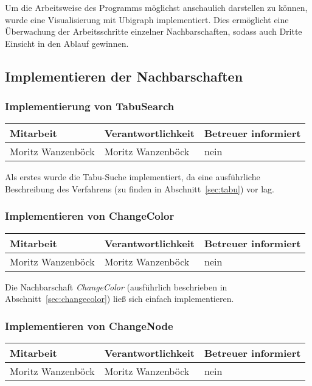 Um die Arbeitsweise des Programms möglichst anschaulich darstellen zu können, wurde eine Visualisierung mit Ubigraph implementiert. Dies ermöglicht eine Überwachung der Ar\-beits\-schrit\-te einzelner Nachbarschaften, sodass auch Dritte Einsicht in den Ablauf gewinnen.

\subsection{Implementieren der Nachbarschaften}

\subsubsection{ Implementierung von TabuSearch}

\begin{center}
\begin{tabular}{lll}
	Mitarbeit & Verantwortlichkeit & Betreuer informiert \\
	\hline
	Moritz Wanzenböck & Moritz Wanzenböck & nein \\
\end{tabular}
\end{center}

Als erstes wurde die Tabu-Suche implementiert, da eine ausführliche Beschreibung des Verfahrens (zu finden in Abschnitt~\ref{sec:tabu}) vor lag.

\subsubsection{ Implementieren von ChangeColor}
\begin{center}
\begin{tabular}{lll}
	Mitarbeit & Verantwortlichkeit & Betreuer informiert \\
	\hline
	Moritz Wanzenböck & Moritz Wanzenböck & nein \\
\end{tabular}
\end{center}

Die Nachbarschaft \emph{ChangeColor} (ausführlich beschrieben in Abschnitt~\ref{sec:changecolor}) ließ sich einfach implementieren.

\subsubsection{ Implementieren von ChangeNode} 

\begin{center}
\begin{tabular}{lll}
	Mitarbeit & Verantwortlichkeit & Betreuer informiert \\
	\hline
	Moritz Wanzenböck & Moritz Wanzenböck & nein \\
\end{tabular}
\end{center}

